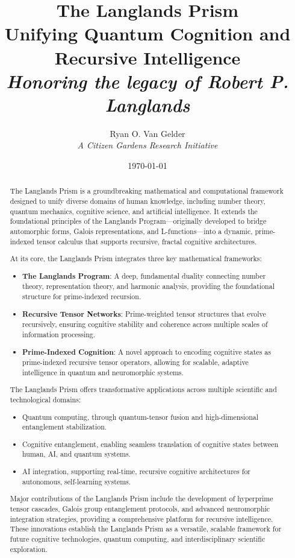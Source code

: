 \documentclass[11pt]{article}
\title{
\textbf{The Langlands Prism} \\
\Large Unifying Quantum Cognition and Recursive Intelligence \\
\large \textit{Honoring the legacy of Robert P. Langlands}
}
\author{Ryan O. Van Gelder \\ \textit{A Citizen Gardens Research Initiative}}
\date{\today}
\begin{document}
\maketitle
\begin{abstract}

The Langlands Prism is a groundbreaking mathematical and computational framework designed to unify diverse domains of human knowledge, including number theory, quantum mechanics, cognitive science, and artificial intelligence. It extends the foundational principles of the Langlands Program—originally developed to bridge automorphic forms, Galois representations, and L-functions—into a dynamic, prime-indexed tensor calculus that supports recursive, fractal cognitive architectures.

At its core, the Langlands Prism integrates three key mathematical frameworks:

\begin{itemize}
    \item \textbf{The Langlands Program}:
    A deep, fundamental duality connecting number theory, representation theory, and harmonic analysis, providing the foundational structure for prime-indexed recursion.

    \item \textbf{Recursive Tensor Networks}:
    Prime-weighted tensor structures that evolve recursively, ensuring cognitive stability and coherence across multiple scales of information processing.

    \item \textbf{Prime-Indexed Cognition}:
    A novel approach to encoding cognitive states as prime-indexed recursive tensor operators, allowing for scalable, adaptive intelligence in quantum and neuromorphic systems.
\end{itemize}

The Langlands Prism offers transformative applications across multiple scientific and technological domains:

\begin{itemize}
    \item Quantum computing, through quantum-tensor fusion and high-dimensional entanglement stabilization.
    \item Cognitive entanglement, enabling seamless translation of cognitive states between human, AI, and quantum systems.
    \item AI integration, supporting real-time, recursive cognitive architectures for autonomous, self-learning systems.
\end{itemize}

Major contributions of the Langlands Prism include the development of hyperprime tensor cascades, Galois group entanglement protocols, and advanced neuromorphic integration strategies, providing a comprehensive platform for recursive intelligence. These innovations establish the Langlands Prism as a versatile, scalable framework for future cognitive technologies, quantum computing, and interdisciplinary scientific exploration.
\end{abstract}
\end{document}
